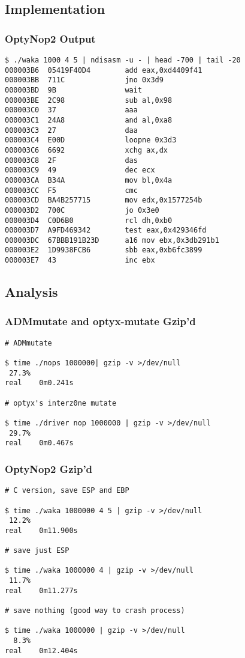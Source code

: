 \documentclass{beamer}
\begin{document}
\subsection{Implementation}

\begin{frame}[fragile]
  \frametitle{OptyNop2 Output}
  {\footnotesize
  \begin{verbatim}
$ ./waka 1000 4 5 | ndisasm -u - | head -700 | tail -20
000003B6  05419F40D4        add eax,0xd4409f41
000003BB  711C              jno 0x3d9
000003BD  9B                wait
000003BE  2C98              sub al,0x98
000003C0  37                aaa
000003C1  24A8              and al,0xa8
000003C3  27                daa
000003C4  E00D              loopne 0x3d3
000003C6  6692              xchg ax,dx
000003C8  2F                das
000003C9  49                dec ecx
000003CA  B34A              mov bl,0x4a
000003CC  F5                cmc
000003CD  BA4B257715        mov edx,0x1577254b
000003D2  700C              jo 0x3e0
000003D4  C0D6B0            rcl dh,0xb0
000003D7  A9FD469342        test eax,0x429346fd
000003DC  67BBB191B23D      a16 mov ebx,0x3db291b1
000003E2  1D9938FCB6        sbb eax,0xb6fc3899
000003E7  43                inc ebx
\end{verbatim}
}

\end{frame}



\subsection{Analysis}

\begin{frame}[fragile]
  \frametitle{ADMmutate and optyx-mutate Gzip'd}
  {\footnotesize
  \begin{verbatim}
# ADMmutate

$ time ./nops 1000000| gzip -v >/dev/null
 27.3%
real    0m0.241s

# optyx's interz0ne mutate

$ time ./driver nop 1000000 | gzip -v >/dev/null
 29.7%
real    0m0.467s
\end{verbatim}
}
\end{frame}

\begin{frame}[fragile]
  \frametitle{OptyNop2 Gzip'd}
  {\footnotesize
  \begin{verbatim}
# C version, save ESP and EBP

$ time ./waka 1000000 4 5 | gzip -v >/dev/null
 12.2%
real    0m11.900s

# save just ESP

$ time ./waka 1000000 4 | gzip -v >/dev/null
 11.7%
real    0m11.277s

# save nothing (good way to crash process)

$ time ./waka 1000000 | gzip -v >/dev/null
  8.3%
real    0m12.404s
\end{verbatim}
}
\end{frame}
\end{document}
